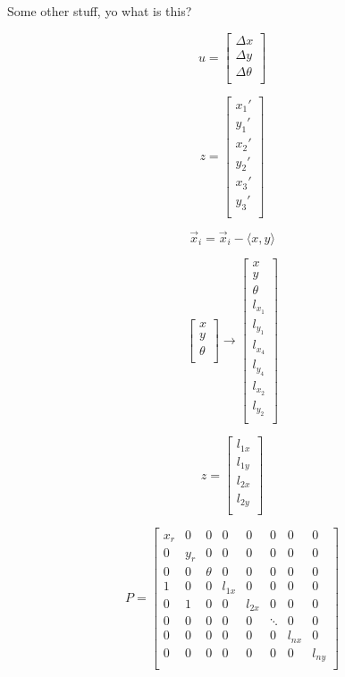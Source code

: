 \documentclass[prodmode,acmtecs]{acmsmall} %
\begin{document}
Some other stuff, yo what is this?




$$
u = 
\begin{bmatrix}
    \Delta x \\
    \Delta y \\
    \Delta \theta \\
\end{bmatrix}
$$

$$
z = 
\begin{bmatrix}
    x_1' \\
    y_1' \\
    x_2' \\
    y_2' \\
    x_3' \\
    y_3' \\
\end{bmatrix}
$$


$$
\vec{x}_i = \vec{x}_i - \langle x, y \rangle
$$







$$
\begin{bmatrix}
    x \\
    y \\
    \theta \\
\end{bmatrix}
\rightarrow
\begin{bmatrix}
    x \\
    y \\
    \theta \\
    l_{x_1} \\
    l_{y_1} \\
    l_{x_4} \\
    l_{y_4} \\
    l_{x_2} \\
    l_{y_2} \\
\end{bmatrix}
$$

$$
z = 
\begin{bmatrix}
    l_{1x} \\
    l_{1y} \\
    l_{2x} \\
    l_{2y} \\
\end{bmatrix}
$$

$$
P =
\begin{bmatrix}
    x_r & 0 & 0 & 0 & 0 & 0 & 0 & 0 \\
    0 & y_r & 0 & 0 & 0 & 0 & 0 & 0 \\
    0 & 0 & \theta & 0 & 0 & 0 & 0 & 0 \\
    1 & 0 & 0 & l_{1x} & 0 & 0 & 0 & 0 \\
    0 & 1 & 0 & 0 & l_{2x} & 0 & 0 & 0 \\
    0 & 0 & 0 & 0 & 0 & \ddots & 0 & 0 \\
    0 & 0 & 0 & 0 & 0 & 0 & l_{nx} & 0 \\
    0 & 0 & 0 & 0 & 0 & 0 & 0 & l_{ny} \\
\end{bmatrix}
$$
\end{document}
